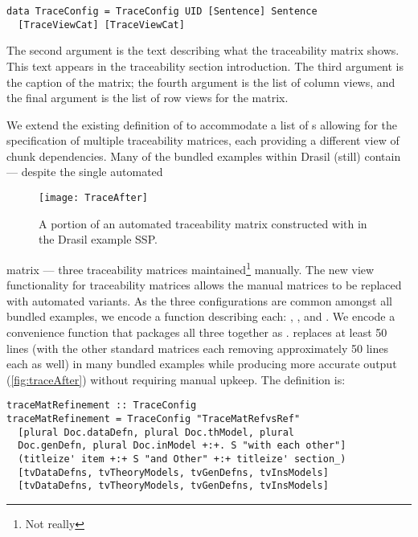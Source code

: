 \begin{tcolorbox}
\begin{verbatim}
data TraceConfig = TraceConfig UID [Sentence] Sentence
  [TraceViewCat] [TraceViewCat]
\end{verbatim}
\end{tcolorbox}

The second argument is the text describing what the traceability matrix shows. This text appears in the traceability section introduction. The third argument is the caption of the matrix; the fourth argument is the list of column views, and the final argument is the list of row views for the matrix. 

We extend the existing definition of  to accommodate a list of s allowing for the specification of multiple traceability matrices, each providing a different view of chunk dependencies. Many of the bundled examples within Drasil (still) contain --- despite the single automated

\begin{figure}[H]
\texttt{[image: TraceAfter]}
\caption{A portion of an automated traceability matrix constructed with  in the Drasil example SSP.}\label{fig:traceAfter}
\end{figure}

\noindent matrix --- three traceability matrices maintained\footnote{Not really} manually. The new view functionality for traceability matrices allows the manual matrices to be replaced with automated variants. As the three configurations are common amongst all bundled examples, we encode a function describing each: , , and . We encode a convenience function that packages all three together as .  replaces at least 50 lines (with the other standard matrices each removing approximately 50 lines each as well) in many bundled examples while producing more accurate output (\autoref{fig:traceAfter}) without requiring manual upkeep. The definition is:

\begin{tcolorbox}[breakable, toprule at break=0pt, bottomrule at break=0pt]
\begin{verbatim}
traceMatRefinement :: TraceConfig
traceMatRefinement = TraceConfig "TraceMatRefvsRef"
  [plural Doc.dataDefn, plural Doc.thModel, plural
  Doc.genDefn, plural Doc.inModel +:+. S "with each other"]
  (titleize' item +:+ S "and Other" +:+ titleize' section_)
  [tvDataDefns, tvTheoryModels, tvGenDefns, tvInsModels]
  [tvDataDefns, tvTheoryModels, tvGenDefns, tvInsModels]
\end{verbatim}
\end{tcolorbox}

